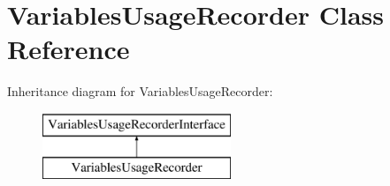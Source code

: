 \hypertarget{class_pes_1_1_view_1_1_recorder_1_1_variables_usage_recorder}{}\section{Variables\+Usage\+Recorder Class Reference}
\label{class_pes_1_1_view_1_1_recorder_1_1_variables_usage_recorder}
Inheritance diagram for Variables\+Usage\+Recorder\+:\begin{figure}[H]
\begin{center}
\leavevmode
\includegraphics[height=2.000000cm]{class_pes_1_1_view_1_1_recorder_1_1_variables_usage_recorder}
\end{center}
\end{figure}
